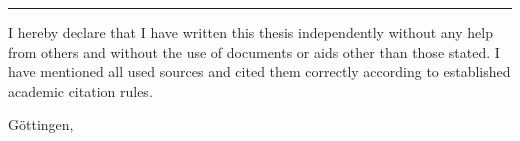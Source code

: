 \thispagestyle{empty}

\null
\vspace{16.5cm}

\rule{\textwidth}{0.4pt}

I hereby declare that I have written this thesis independently without any help from others and without the use of documents or aids other than those stated. I have mentioned all used sources and cited them correctly according to established academic citation rules.

\vspace{0.2cm}

Göttingen, \mysubmissiondate